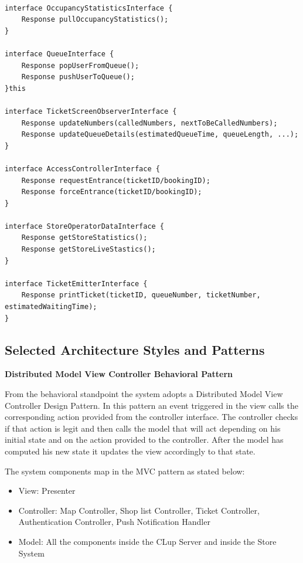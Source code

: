 \begin{lstlisting}

interface OccupancyStatisticsInterface {
    Response pullOccupancyStatistics();
}

interface QueueInterface {
    Response popUserFromQueue();
    Response pushUserToQueue();
}this

interface TicketScreenObserverInterface {
    Response updateNumbers(calledNumbers, nextToBeCalledNumbers);
    Response updateQueueDetails(estimatedQueueTime, queueLength, ...);
}

interface AccessControllerInterface {
    Response requestEntrance(ticketID/bookingID);
    Response forceEntrance(ticketID/bookingID);
}

interface StoreOperatorDataInterface {
    Response getStoreStatistics();
    Response getStoreLiveStastics();
}

interface TicketEmitterInterface {
    Response printTicket(ticketID, queueNumber, ticketNumber, estimatedWaitingTime);
}

\end{lstlisting}



\clearpage
\subsection{Selected Architecture Styles and Patterns}
\textbf{Distributed Model View Controller Behavioral Pattern}

\medskip

From the behavioral standpoint the system adopts a Distributed Model View Controller Design Pattern. In this pattern an event triggered in the view calls the corresponding action provided from the controller interface. The controller checks if that action is legit and then calls the model that will act depending on his initial state and on the action provided to the controller. 
After the model has computed his new state it updates the view accordingly to that state.

The system components map in the MVC pattern as stated below:
\begin{itemize}
    \item View: Presenter 
    \item Controller: Map Controller, Shop list Controller, Ticket Controller, Authentication Controller, Push Notification Handler
    \item Model: All the components inside the CLup Server and inside the Store System
\end{itemize}

